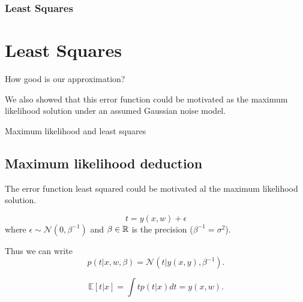   \begin{frame}
    \frametitle{Least Squares}
    \section{Least Squares}
    How good is our approximation?
  
    We also showed that this error function could 
    be motivated as the maximum likelihood 
    solution under an assumed Gaussian noise model.
  \end{frame}
  
  \begin{frame}{Maximum likelihood and least squares}
    \subsection{Maximum likelihood deduction}
    The error function least squared could be motivated
    al the maximum likelihood solution. 
  
    \begin{equation}
      t = y(x,w) + \epsilon 
    \end{equation}
    where $\epsilon \sim \mathcal{N}(0, \beta^{-1})$ 
    and $\beta \in \mathbb{R}$ is the precision ($\beta^{-1} = \sigma^2$). 
  
    Thus we can write
    \begin{equation}
      p(t | x, w, \beta) = \mathcal{N}(t | y(x,y), \beta^{-1}). 
    \end{equation}
  
    \begin{equation}
      \mathbb{E}[t | x] = 
      \int t p(t|x) dt
      = y(x,w).
    \end{equation}
    
  \end{frame}
  
